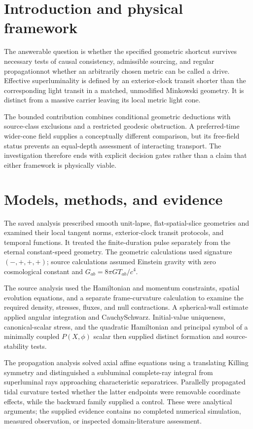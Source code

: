 \documentclass[11pt]{article}
\begin{document}
\section{Introduction and physical framework}
The answerable question is whether the specified geometric shortcut survives necessary tests of causal consistency, admissible sourcing, and regular propagation\textemdash{}not whether an arbitrarily chosen metric can be called a drive. Effective superluminality is defined by an exterior-clock transit shorter than the corresponding light transit in a matched, unmodified Minkowski geometry. It is distinct from a massive carrier leaving its local metric light cone.

The bounded contribution combines conditional geometric deductions with source-class exclusions and a restricted geodesic obstruction. A preferred-time wider-cone field supplies a conceptually different comparison, but its free-field status prevents an equal-depth assessment of interacting transport. The investigation therefore ends with explicit decision gates rather than a claim that either framework is physically viable.

\section{Models, methods, and evidence}
The saved analysis prescribed smooth unit-lapse, flat-spatial-slice geometries and examined their local tangent norms, exterior-clock transit protocols, and temporal functions. It treated the finite-duration pulse separately from the eternal constant-speed geometry. The geometric calculations used signature $(-,+,+,+)$; source calculations assumed Einstein gravity with zero cosmological constant and $G_{ab}=8\pi G T_{ab}/c^4$.

The source analysis used the Hamiltonian and momentum constraints, spatial evolution equations, and a separate frame-curvature calculation to examine the required density, stresses, fluxes, and null contractions. A spherical-wall estimate applied angular integration and Cauchy\textendash{}\allowbreak{}Schwarz. Initial-value uniqueness, canonical-scalar stress, and the quadratic Hamiltonian and principal symbol of a minimally coupled $P(X,\phi)$ scalar then supplied distinct formation and source-stability tests.

The propagation analysis solved axial affine equations using a translating Killing symmetry and distinguished a subluminal complete-ray integral from superluminal rays approaching characteristic separatrices. Parallelly propagated tidal curvature tested whether the latter endpoints were removable coordinate effects, while the backward family supplied a control. These were analytical arguments; the supplied evidence contains no completed numerical simulation, measured observation, or inspected domain-literature assessment.
\end{document}
